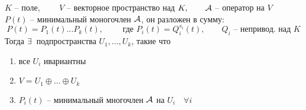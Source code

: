 \begin{theorem}
	$ K $ -- поле, $ \qquad V $ -- векторное пространство над $ K, \qquad \mathcal{A} $ -- оператор на $ V $ \\
	$ P(t) $ -- минимальный моногочлен $ \mathcal{A} $, он разложен в сумму:
	$$ P(t) = P_1(t)...P_k(t), \qquad \text{ где } P_i(t) = Q_i^{s_i}(t), \qquad Q_i \text{ -- непривод. над } K $$
	Тогда $ \exists\, $ подпространства $ U_1, ..., U_k $, такие что
	\begin{enumerate}
		\item все $ U_i $ ивариантны
		\item $ V = U_1 \oplus ... \oplus U_k $
		\item $ P_i(t) $ -- минимальный многочлен $ \mathcal{A} $ на $ U_i \quad \forall i $
	\end{enumerate}
\end{theorem}

